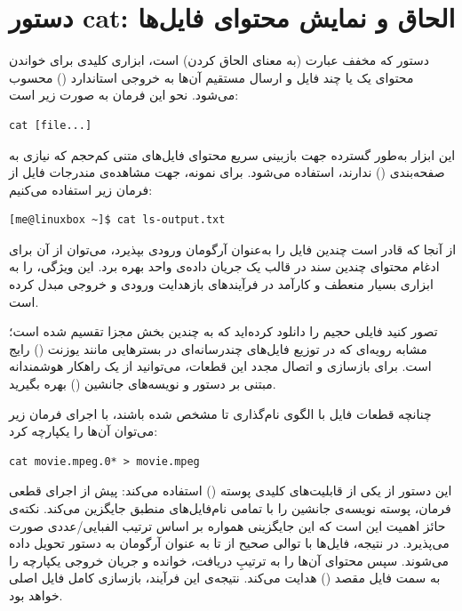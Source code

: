\section{دستور cat: الحاق و نمایش محتوای فایل‌ها}

دستور  که مخفف عبارت  (به معنای الحاق کردن) است، ابزاری کلیدی برای خواندن محتوای یک یا چند فایل و ارسال مستقیم آن‌ها به خروجی استاندارد () محسوب می‌شود. نحو این فرمان به صورت زیر است:

\begin{latin}
\begin{lstlisting}
cat [file...]
\end{lstlisting}
\end{latin}

این ابزار به‌طور گسترده جهت بازبینی سریع محتوای فایل‌های متنی کم‌حجم که نیازی به صفحه‌بندی () ندارند، استفاده می‌شود. برای نمونه، جهت مشاهده‌ی مندرجات فایل  از فرمان زیر استفاده می‌کنیم:

\begin{latin}
\begin{lstlisting}
[me@linuxbox ~]$ cat ls-output.txt
\end{lstlisting}
\end{latin}

از آنجا که  قادر است چندین فایل را به‌عنوان آرگومان ورودی بپذیرد، می‌توان از آن برای ادغام محتوای چندین سند در قالب یک جریان داده‌ی واحد بهره برد. این ویژگی،  را به ابزاری بسیار منعطف و کارآمد در فرآیندهای بازهدایت ورودی و خروجی مبدل کرده است.

تصور کنید فایلی حجیم را دانلود کرده‌اید که به چندین بخش مجزا تقسیم شده است؛ مشابه رویه‌ای که در توزیع فایل‌های چندرسانه‌ای در بسترهایی مانند یوزنت () رایج است. برای بازسازی و اتصال مجدد این قطعات، می‌توانید از یک راهکار هوشمندانه مبتنی بر دستور  و نویسه‌های جانشین () بهره بگیرید.

چنانچه قطعات فایل با الگوی نام‌گذاری  تا  مشخص شده باشند، با اجرای فرمان زیر می‌توان آن‌ها را یکپارچه کرد:

\begin{latin}
\begin{lstlisting}
cat movie.mpeg.0* > movie.mpeg
\end{lstlisting}
\end{latin}

این دستور از یکی از قابلیت‌های کلیدی پوسته () استفاده می‌کند: پیش از اجرای قطعی فرمان، پوسته نویسه‌ی جانشین را با تمامی نام‌فایل‌های منطبق جایگزین می‌کند. نکته‌ی حائز اهمیت این است که این جایگزینی همواره بر اساس ترتیب الفبایی/عددی صورت می‌پذیرد. در نتیجه، فایل‌ها با توالی صحیح از  تا  به عنوان آرگومان به دستور  تحویل داده می‌شوند. سپس  محتوای آن‌ها را به ترتیبِ دریافت، خوانده و جریان خروجی یکپارچه را به سمت فایل مقصد () هدایت می‌کند. نتیجه‌ی این فرآیند، بازسازی کامل فایل اصلی خواهد بود.

